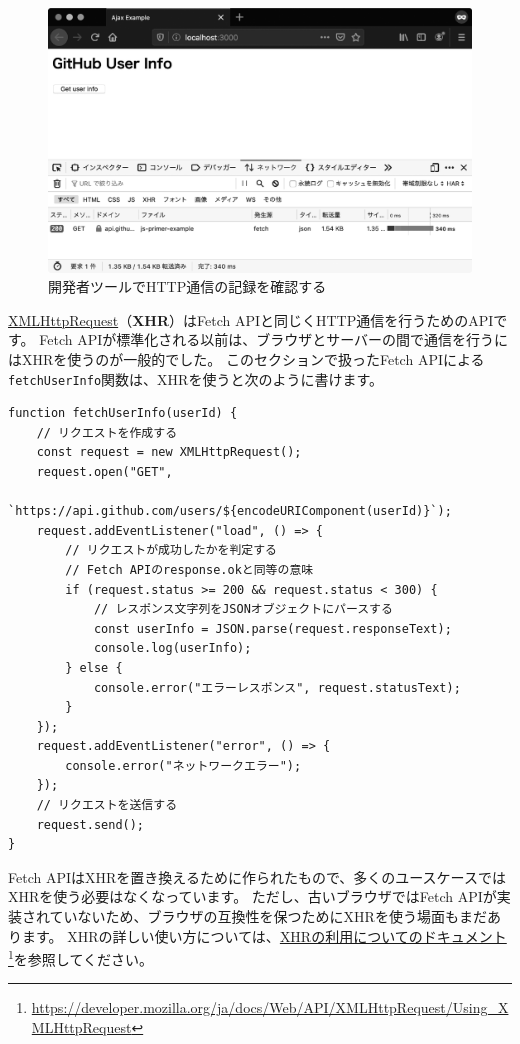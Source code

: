 \begin{figure}[h]
\centering
\includegraphics[width=120mm]{fig/fig-3.eps}
\caption{開発者ツールでHTTP通信の記録を確認する}
\end{figure}

\begin{tcolorbox}[title=XMLHttpRequest]\label{xhr}

\href{https://developer.mozilla.org/ja/docs/Web/API/XMLHttpRequest}{XMLHttpRequest}（\textbf{XHR}）はFetch
APIと同じくHTTP通信を行うためのAPIです。 Fetch
APIが標準化される以前は、ブラウザとサーバーの間で通信を行うにはXHRを使うのが一般的でした。
このセクションで扱ったFetch
APIによる\texttt{fetchUserInfo}関数は、XHRを使うと次のように書けます。

\begin{lstlisting}
function fetchUserInfo(userId) {
    // リクエストを作成する
    const request = new XMLHttpRequest();
    request.open("GET", 
            `https://api.github.com/users/${encodeURIComponent(userId)}`);
    request.addEventListener("load", () => {
        // リクエストが成功したかを判定する
        // Fetch APIのresponse.okと同等の意味
        if (request.status >= 200 && request.status < 300) {
            // レスポンス文字列をJSONオブジェクトにパースする
            const userInfo = JSON.parse(request.responseText);
            console.log(userInfo);
        } else {
            console.error("エラーレスポンス", request.statusText);
        }
    });
    request.addEventListener("error", () => {
        console.error("ネットワークエラー");
    });
    // リクエストを送信する
    request.send();
}
\end{lstlisting}

Fetch
APIはXHRを置き換えるために作られたもので、多くのユースケースではXHRを使う必要はなくなっています。
ただし、古いブラウザではFetch
APIが実装されていないため、ブラウザの互換性を保つためにXHRを使う場面もまだあります。
XHRの詳しい使い方については、\href{https://developer.mozilla.org/ja/docs/Web/API/XMLHttpRequest/Using_XMLHttpRequest}{XHRの利用についてのドキュメント}\footnote{\url{https://developer.mozilla.org/ja/docs/Web/API/XMLHttpRequest/Using_XMLHttpRequest}}を参照してください。
\end{tcolorbox}

